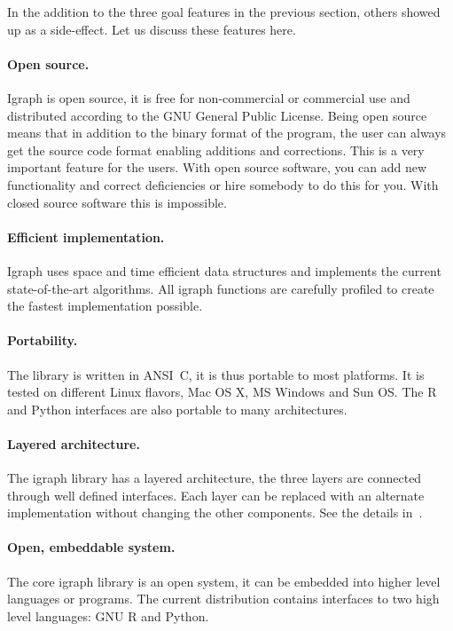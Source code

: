 \documentclass[twoside]{book}%
\begin{document}
In the addition to the three goal features in the previous section,
others showed up as a side-effect. Let us discuss these features here.

\paragraph{Open source.} Igraph is open source, it is free for
non-commercial or commercial use and distributed according to the GNU
General Public License. Being open source means that in addition to
the binary format of the program, the user can
always get the source code format enabling additions and corrections.
This is a very important feature for the users. With open source
software, you can add new functionality and correct deficiencies or
hire somebody to do this for you. With closed source software this is
impossible. 

\paragraph{Efficient implementation.} Igraph uses space and time
efficient data structures and implements the current state-of-the-art
algorithms. All igraph functions are carefully profiled to create the
fastest implementation possible.

\paragraph{Portability.} The library is written in ANSI~C, it is thus
portable to most platforms. It is tested on different Linux flavors,
Mac OS X, MS Windows and Sun OS. The R and Python interfaces are also
portable to many architectures.

\paragraph{Layered architecture.} The igraph library has a layered
architecture, the three layers are connected through well defined
interfaces. Each layer can be replaced with an alternate
implementation without changing the other components. See the details
in~.

\paragraph{Open, embeddable system.} The core igraph library is an
open system, it can be embedded into higher level languages or
programs. The current distribution contains interfaces to two high
level languages: GNU R and Python.
\end{document}
